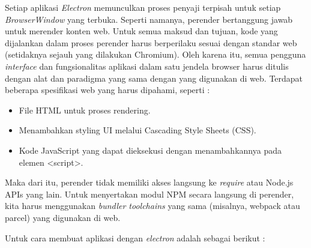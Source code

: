 Setiap aplikasi \textit{Electron} memunculkan proses penyaji terpisah untuk setiap \textit{BrowserWindow} yang terbuka. Seperti namanya, perender bertanggung jawab untuk merender konten web. Untuk semua maksud dan tujuan, kode yang dijalankan dalam proses perender harus berperilaku sesuai dengan standar web (setidaknya sejauh yang dilakukan Chromium). Oleh karena itu, semua pengguna \textit{interface} dan fungsionalitas aplikasi dalam satu jendela browser harus ditulis dengan alat dan paradigma yang sama dengan yang digunakan di web. Terdapat beberapa spesifikasi web yang harus dipahami, seperti :

\begin{itemize}
    \item File HTML untuk proses rendering.
    \item Menambahkan styling UI melalui Cascading Style Sheets (CSS).
    \item Kode JavaScript yang dapat dieksekusi dengan menambahkannya pada elemen <script>.
\end{itemize}

Maka dari itu, perender tidak memiliki akses langsung ke \textit{require} atau Node.js APIs yang lain. Untuk menyertakan modul NPM secara langsung di perender, kita harus menggunakan \textit{bundler toolchains} yang sama (misalnya, webpack atau parcel) yang digunakan di web.

Untuk cara membuat aplikasi dengan \textit{electron} adalah sebagai berikut : \cite{installElectron}

